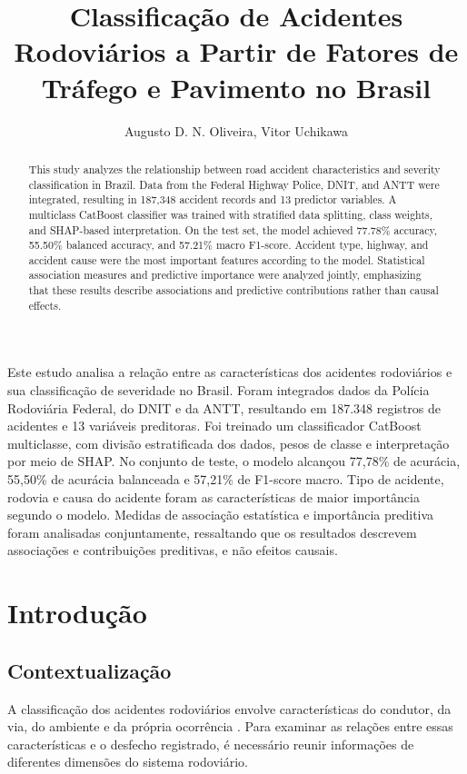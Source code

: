 \documentclass[12pt]{article}
\title{Classificação de Acidentes Rodoviários a Partir de Fatores de Tráfego e Pavimento no Brasil}
\author{Augusto D. N. Oliveira\inst{1}, Vitor Uchikawa\inst{2}}
\begin{document}
\maketitle

\begin{abstract}
This study analyzes the relationship between road accident characteristics and severity classification in Brazil. Data from the Federal Highway Police, DNIT, and ANTT were integrated, resulting in 187,348 accident records and 13 predictor variables. A multiclass CatBoost classifier was trained with stratified data splitting, class weights, and SHAP-based interpretation. On the test set, the model achieved 77.78\% accuracy, 55.50\% balanced accuracy, and 57.21\% macro F1-score. Accident type, highway, and accident cause were the most important features according to the model. Statistical association measures and predictive importance were analyzed jointly, emphasizing that these results describe associations and predictive contributions rather than causal effects.
\end{abstract}
     
\begin{resumo} 
Este estudo analisa a relação entre as características dos acidentes rodoviários e sua classificação de severidade no Brasil. Foram integrados dados da Polícia Rodoviária Federal, do DNIT e da ANTT, resultando em 187.348 registros de acidentes e 13 variáveis preditoras. Foi treinado um classificador CatBoost multiclasse, com divisão estratificada dos dados, pesos de classe e interpretação por meio de SHAP. No conjunto de teste, o modelo alcançou 77,78\% de acurácia, 55,50\% de acurácia balanceada e 57,21\% de F1-score macro. Tipo de acidente, rodovia e causa do acidente foram as características de maior importância segundo o modelo. Medidas de associação estatística e importância preditiva foram analisadas conjuntamente, ressaltando que os resultados descrevem associações e contribuições preditivas, e não efeitos causais.
\end{resumo}

\section{Introdução}

\subsection{Contextualização}

A classificação dos acidentes rodoviários envolve características do condutor, da via, do ambiente e da própria ocorrência \cite{who2023roadsafety}. Para examinar as relações entre essas características e o desfecho registrado, é necessário reunir informações de diferentes dimensões do sistema rodoviário.
\end{document}
